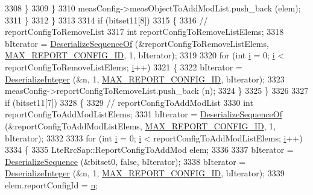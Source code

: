 \begin{DoxyCode}
3308                 \}
3309             \}
3310           measConfig->measObjectToAddModList.push\_back (elem);
3311         \}
3312     \}
3313 
3314   \textcolor{keywordflow}{if} (bitset11[8])
3315     \{
3316       \textcolor{comment}{// reportConfigToRemoveList}
3317       \textcolor{keywordtype}{int} reportConfigToRemoveListElems;
3318       bIterator = \hyperlink{classns3_1_1Asn1Header_a1a7245e05b482df8abade0a060bd0ecc}{DeserializeSequenceOf} (&reportConfigToRemoveListElems, 
      \hyperlink{lte-rrc-header_8cc_af8a3b931c04f0fa0e31e7c8480ba0bb6}{MAX\_REPORT\_CONFIG\_ID}, 1, bIterator);
3319 
3320       \textcolor{keywordflow}{for} (\textcolor{keywordtype}{int} \hyperlink{bernuolliDistribution_8m_a6f6ccfcf58b31cb6412107d9d5281426}{i} = 0; \hyperlink{bernuolliDistribution_8m_a6f6ccfcf58b31cb6412107d9d5281426}{i} < reportConfigToRemoveListElems; \hyperlink{bernuolliDistribution_8m_a6f6ccfcf58b31cb6412107d9d5281426}{i}++)
3321         \{
3322           bIterator = \hyperlink{classns3_1_1Asn1Header_a49802c9af30018b078150e866b6ecae2}{DeserializeInteger} (&n, 1, 
      \hyperlink{lte-rrc-header_8cc_af8a3b931c04f0fa0e31e7c8480ba0bb6}{MAX\_REPORT\_CONFIG\_ID}, bIterator);
3323           measConfig->reportConfigToRemoveList.push\_back (n);
3324         \}
3325     \}
3326 
3327   \textcolor{keywordflow}{if} (bitset11[7])
3328     \{
3329       \textcolor{comment}{// reportConfigToAddModList}
3330       \textcolor{keywordtype}{int} reportConfigToAddModListElems;
3331       bIterator = \hyperlink{classns3_1_1Asn1Header_a1a7245e05b482df8abade0a060bd0ecc}{DeserializeSequenceOf} (&reportConfigToAddModListElems, 
      \hyperlink{lte-rrc-header_8cc_af8a3b931c04f0fa0e31e7c8480ba0bb6}{MAX\_REPORT\_CONFIG\_ID}, 1, bIterator);
3332 
3333       \textcolor{keywordflow}{for} (\textcolor{keywordtype}{int} \hyperlink{bernuolliDistribution_8m_a6f6ccfcf58b31cb6412107d9d5281426}{i} = 0; \hyperlink{bernuolliDistribution_8m_a6f6ccfcf58b31cb6412107d9d5281426}{i} < reportConfigToAddModListElems; \hyperlink{bernuolliDistribution_8m_a6f6ccfcf58b31cb6412107d9d5281426}{i}++)
3334         \{
3335           LteRrcSap::ReportConfigToAddMod elem;
3336 
3337           bIterator = \hyperlink{classns3_1_1Asn1Header_a58c68bb97ba3fe2e8fcdd7c208d672b2}{DeserializeSequence} (&bitset0, \textcolor{keyword}{false}, bIterator);
3338           bIterator = \hyperlink{classns3_1_1Asn1Header_a49802c9af30018b078150e866b6ecae2}{DeserializeInteger} (&n, 1, 
      \hyperlink{lte-rrc-header_8cc_af8a3b931c04f0fa0e31e7c8480ba0bb6}{MAX\_REPORT\_CONFIG\_ID}, bIterator);
3339           elem.reportConfigId = \hyperlink{namespacesample-rng-plot_aeb5ee5c431e338ef39b7ac5431242e1d}{n};

\end{DoxyCode}
